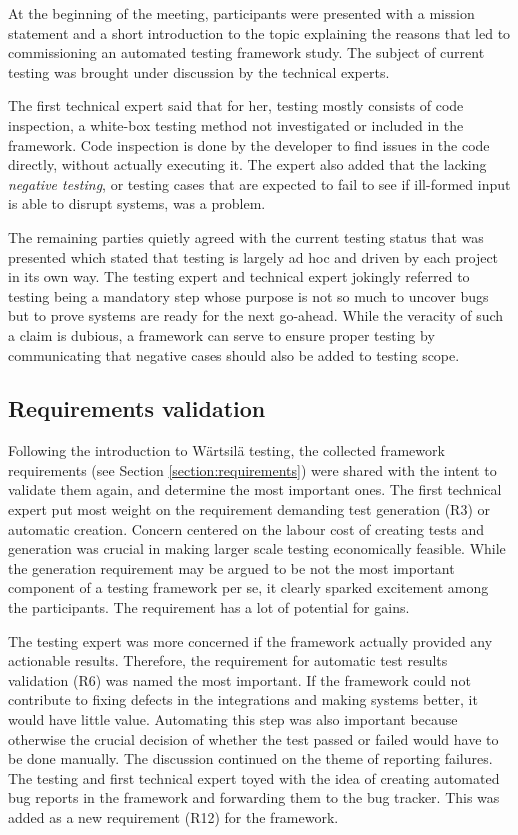 \documentclass[12pt,a4paper,oneside,pdftex]{report}
\begin{document}
{At the beginning of the meeting, participants were presented with a mission statement and a short introduction to the topic explaining the reasons that led to commissioning an automated testing framework study. The subject of current testing was brought under discussion by the technical experts. 

The first technical expert said that for her, testing mostly consists of code inspection, a white-box testing method not investigated or included in the framework. Code inspection is done by the developer to find issues in the code directly, without actually executing it. The expert also added that the lacking \emph{negative testing}, or testing cases that are expected to fail to see if ill-formed input is able to disrupt systems, was a problem. 

The remaining parties quietly agreed with the current testing status that was presented which stated that testing is largely ad hoc and driven by each project in its own way. The testing expert and technical expert jokingly referred to testing being a mandatory step whose purpose is not so much to uncover bugs but to prove systems are ready for the next go-ahead. While the veracity of such a claim is dubious, a framework can serve to ensure proper testing by communicating that negative cases should also be added to testing scope.

\subsection{Requirements validation}
\label{subsection:requirementsvalidation}

Following the introduction to Wärtsilä testing, the collected framework requirements (see Section \ref{section:requirements}) were shared with the intent to validate them again, and determine the most important ones. The first technical expert put most weight on the requirement demanding test generation (R3) or automatic creation. Concern centered on the labour cost of creating tests and generation was crucial in making larger scale testing economically feasible. While the generation requirement may be argued to be not the most important component of a testing framework per se, it clearly sparked excitement among the participants. The requirement has a lot of potential for gains.

The testing expert was more concerned if the framework actually provided any actionable results. Therefore, the requirement for automatic test results validation (R6) was named the most important. If the framework could not contribute to fixing defects in the integrations and making systems better, it would have little value. Automating this step was also important because otherwise the crucial decision of whether the test passed or failed would have to be done manually. The discussion continued on the theme of reporting failures. The testing and first technical expert toyed with the idea of creating automated bug reports in the framework and forwarding them to the bug tracker. This was added as a new requirement (R12) for the framework.

}
\end{document}
